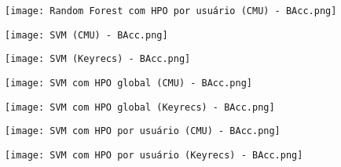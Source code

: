 \begin{figure}[H]
    \caption
    \label{}
    \centering
    \texttt{[image: Random Forest com HPO por usuário (CMU) - BAcc.png]}
\end{figure}
\begin{figure}[H]
    \caption
    \label{}
    \centering
    \texttt{[image: SVM (CMU) - BAcc.png]}
\end{figure}
\begin{figure}[H]
    \caption
    \label{}
    \centering
    \texttt{[image: SVM (Keyrecs) - BAcc.png]}
\end{figure}
\begin{figure}[H]
    \caption
    \label{}
    \centering
    \texttt{[image: SVM com HPO global (CMU) - BAcc.png]}
\end{figure}
\begin{figure}[H]
    \caption
    \label{}
    \centering
    \texttt{[image: SVM com HPO global (Keyrecs) - BAcc.png]}
\end{figure}
\begin{figure}[H]
    \caption
    \label{}
    \centering
    \texttt{[image: SVM com HPO por usuário (CMU) - BAcc.png]}
\end{figure}
\begin{figure}[H]
    \caption
    \label{}
    \centering
    \texttt{[image: SVM com HPO por usuário (Keyrecs) - BAcc.png]}
\end{figure}
